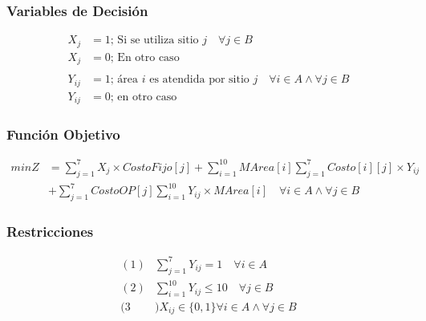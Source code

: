 \documentclass[a4paper,12pt]{article}
\begin{document}
\subsubsection{Variables de Decisión}
\begin{equation*}
\begin{split}
	X_j&=1 \text{; Si se utiliza sitio }j\quad \forall j \in B\\
	X_j&=0 \text{; En otro caso}\\\\
	Y_{ij}&=1 \text{; área } i \text{ es atendida por sitio }j\quad \forall i \in A \wedge \forall j \in B\\
	Y_{ij}&=0 \text{; en otro caso}
\end{split}
\end{equation*}
\subsubsection{Función Objetivo}
\begin{equation*}
\begin{split}
	minZ&=\sum_{j=1}^{7}X_j\times CostoFijo[j]+\sum_{i=1}^{10}MArea[i]\sum_{j=1}^{7}Costo[i][j]\times Y_{ij}\\
	&+\sum_{j=1}^{7}CostoOP[j]\sum_{i=1}^{10}Y_{ij}\times MArea[i] \quad \forall i \in A \wedge \forall j \in B
\end{split}
\end{equation*}
\subsubsection{Restricciones}
\begin{equation*}
	\begin{split}
		(1)&\sum_{j=1}^{7}Y_{ij}=1\quad \forall i\in A\\
		(2)&\sum_{i=1}^{10}Y_{ij}\leq 10\quad \forall j\in B\\
		(3&)X_{ij}\in\{0,1\}\forall i\in A \wedge \forall j\in B
	\end{split}
\end{equation*}
\end{document}

